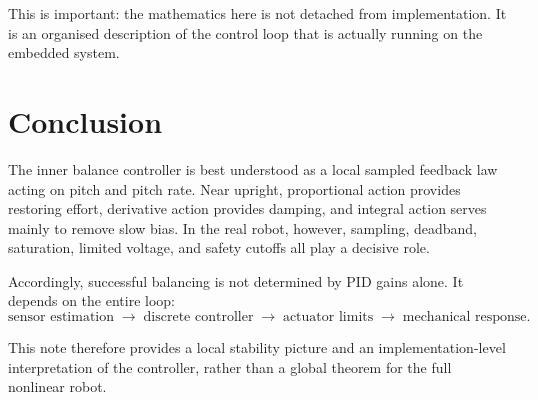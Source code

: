 \documentclass[11pt,a4paper]{article}
\begin{document}
This is important: the mathematics here is not detached from implementation. It is an organised description of the control loop that is actually running on the embedded system.

\section{Conclusion}

The inner balance controller is best understood as a local sampled feedback law acting on pitch and pitch rate. Near upright, proportional action provides restoring effort, derivative action provides damping, and integral action serves mainly to remove slow bias. In the real robot, however, sampling, deadband, saturation, limited voltage, and safety cutoffs all play a decisive role.

Accordingly, successful balancing is not determined by PID gains alone. It depends on the entire loop:
\[
\text{sensor estimation}
\;\longrightarrow\;
\text{discrete controller}
\;\longrightarrow\;
\text{actuator limits}
\;\longrightarrow\;
\text{mechanical response}.
\]

This note therefore provides a local stability picture and an implementation-level interpretation of the controller, rather than a global theorem for the full nonlinear robot.
\end{document}
